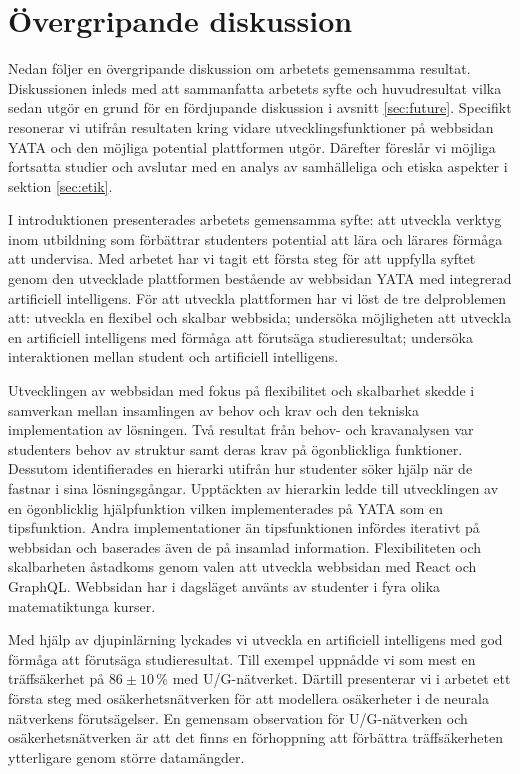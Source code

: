 \chapter{Övergripande diskussion}
\label{sec:Disken}
Nedan följer en övergripande diskussion om arbetets gemensamma resultat. Diskussionen inleds med att sammanfatta arbetets syfte och huvudresultat vilka sedan utgör en grund för en fördjupande diskussion i avsnitt \ref{sec:future}. Specifikt resonerar vi utifrån resultaten kring vidare utvecklingsfunktioner på webbsidan YATA och den möjliga potential plattformen utgör. Därefter föreslår vi möjliga fortsatta studier och avslutar med en analys av samhälleliga och etiska aspekter i sektion \ref{sec:etik}. 

I introduktionen presenterades arbetets gemensamma syfte: att utveckla verktyg inom utbildning som förbättrar studenters potential att lära och lärares förmåga att undervisa. Med arbetet har vi tagit ett första steg för att uppfylla syftet genom den utvecklade plattformen bestående av webbsidan YATA med integrerad artificiell intelligens. För att utveckla plattformen har vi löst de tre delproblemen att: utveckla en flexibel och skalbar webbsida; undersöka möjligheten att utveckla en artificiell intelligens med förmåga att förutsäga studieresultat; undersöka interaktionen mellan student och artificiell intelligens.

Utvecklingen av webbsidan med fokus på flexibilitet och skalbarhet skedde i samverkan mellan insamlingen av behov och krav och den tekniska implementation av lösningen. Två resultat från behov- och kravanalysen var studenters behov av struktur samt deras krav på ögonblickliga funktioner. Dessutom identifierades en hierarki utifrån hur studenter söker hjälp när de fastnar i sina lösningsgångar. Upptäckten av hierarkin ledde till utvecklingen av en ögonblicklig hjälpfunktion vilken implementerades på YATA som en tipsfunktion. Andra implementationer än tipsfunktionen infördes iterativt på webbsidan och baserades även de på insamlad information. Flexibiliteten och skalbarheten åstadkoms genom valen att utveckla webbsidan med React och GraphQL. Webbsidan har i dagsläget använts av studenter i fyra olika matematiktunga kurser.

Med hjälp av djupinlärning lyckades vi utveckla en artificiell intelligens med god förmåga att förutsäga studieresultat. Till exempel uppnådde vi som mest en träffsäkerhet på $86 \pm 10\,\%$ med U/G-nätverket. Därtill presenterar vi i arbetet ett första steg med osäkerhetsnätverken för att modellera osäkerheter i de neurala nätverkens förutsägelser. En gemensam observation för U/G-nätverken och osäkerhetsnätverken är att det finns en förhoppning att förbättra träffsäkerheten ytterligare genom större datamängder.

